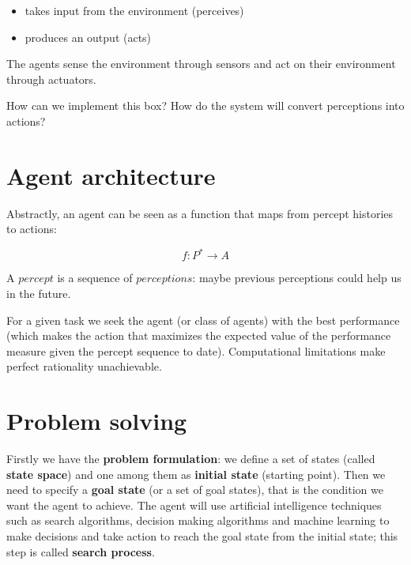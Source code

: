 \documentclass{article}
\begin{document}
\begin{center}
    \begin{itemize}
        \item takes input from the environment (perceives)
        \item produces an output (acts)
    \end{itemize}
\end{center}

The agents sense the environment through sensors and act on their environment through actuators.

How can we implement this box? How do the system will convert perceptions into actions?

\section{Agent architecture}

Abstractly, an agent can be seen as a function that maps from percept histories to actions:

\begin{center}
    \begin{equation}
        f: P^{*} \rightarrow A
    \end{equation}
\end{center}

A $percept$ is a sequence of $perceptions$: maybe previous perceptions could help us in the future.

For a given task we seek the agent (or class of agents) with the best performance (which makes the action that maximizes the expected value of the performance measure given the percept sequence to date).
Computational limitations make perfect rationality unachievable.

\section{Problem solving}

Firstly we have the \textbf{problem formulation}: we define a set of states (called \textbf{state space}) and one among them as \textbf{initial state} (starting point).
Then we need to specify a \textbf{goal state} (or a set of goal states), that is the condition we want the agent to achieve. The agent will use artificial intelligence techniques such as search algorithms, decision making algorithms and machine learning to make decisions and take action to reach the goal state from the initial state; this step is called \textbf{search process}. 
\end{document}
